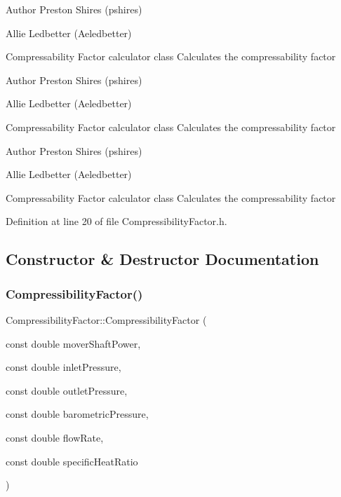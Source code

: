 \begin{DoxyAuthor}{Author}
Preston Shires (pshires) 

Allie Ledbetter (Aeledbetter) 
\end{DoxyAuthor}
Compressability Factor calculator class Calculates the compressability factor

\begin{DoxyAuthor}{Author}
Preston Shires (pshires) 

Allie Ledbetter (Aeledbetter) 
\end{DoxyAuthor}
Compressability Factor calculator class Calculates the compressability factor

\begin{DoxyAuthor}{Author}
Preston Shires (pshires) 

Allie Ledbetter (Aeledbetter) 
\end{DoxyAuthor}
Compressability Factor calculator class Calculates the compressability factor 

Definition at line 20 of file Compressibility\+Factor.\+h.



\subsection{Constructor \& Destructor Documentation}
\mbox{\label{class_compressibility_factor_afb938d7e72ff7bcf5e979dd51f33e6b8}} 
\subsubsection{\texorpdfstring{Compressibility\+Factor()}{CompressibilityFactor()}\hspace{0.1cm}{\footnotesize\ttfamily [1/3]}}
{\footnotesize\ttfamily Compressibility\+Factor\+::\+Compressibility\+Factor (\begin{DoxyParamCaption}\item[{const double}]{mover\+Shaft\+Power,  }\item[{const double}]{inlet\+Pressure,  }\item[{const double}]{outlet\+Pressure,  }\item[{const double}]{barometric\+Pressure,  }\item[{const double}]{flow\+Rate,  }\item[{const double}]{specific\+Heat\+Ratio }\end{DoxyParamCaption})\hspace{0.3cm}{\ttfamily [inline]}}

